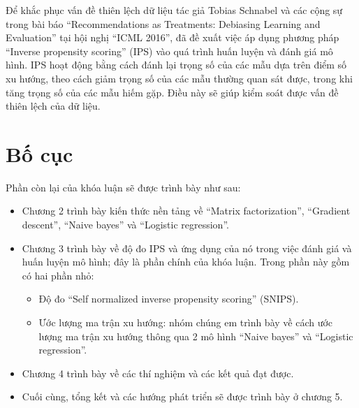 Để khắc phục vấn đề thiên lệch dữ liệu tác giả Tobias Schnabel và các cộng sự \cite{IPS} trong bài báo ``Recommendations as Treatments: Debiasing Learning and Evaluation'' tại hội nghị ``ICML 2016'', đã đề xuất việc áp dụng phương pháp ``Inverse propensity scoring'' (IPS) vào quá trình huấn luyện và đánh giá mô hình. IPS hoạt động bằng cách đánh lại trọng số của các mẫu dựa trên điểm số xu hướng, theo cách giảm trọng số của các mẫu thường quan sát được, trong khi tăng trọng số của các mẫu hiếm gặp. Điều này sẽ giúp kiểm soát được vấn đề thiên lệch của dữ liệu.

\section{Bố cục}
Phần còn lại của khóa luận sẽ được trình bày như sau:
\begin{itemize}
    \item Chương 2 trình bày kiến thức nền tảng về ``Matrix factorization'', ``Gradient descent'', ``Naive bayes'' và ``Logistic regression''.
    \item Chương 3 trình bày về độ đo IPS và ứng dụng của nó trong việc đánh giá và huấn luyện mô hình; đây là phần chính của khóa luận. Trong phần này gồm có hai phần nhỏ:
    \begin{itemize}
        \item Độ đo ``Self normalized inverse propensity scoring'' (SNIPS). 
        \item Ước lượng ma trận xu hướng: nhóm chúng em trình bày về cách ước lượng ma trận xu hướng thông qua 2 mô hình ``Naive bayes'' và ``Logistic regression''.
    \end{itemize}
    \item Chương 4 trình bày về các thí nghiệm và các kết quả đạt được.
    \item Cuối cùng, tổng kết và các hướng phát triển sẽ được trình bày ở chương 5.
\end{itemize}
